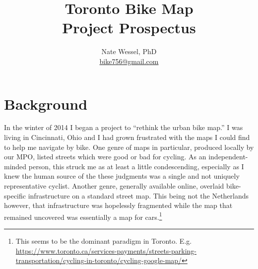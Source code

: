 \documentclass{article}
\title{Toronto Bike Map \\ Project Prospectus}
\author{Nate Wessel, PhD \\ \small \href{mailto:bike756@gmail.com}{bike756@gmail.com}}
\begin{document}
	\maketitle
	
	\section*{Background}
		In the winter of 2014 I began a project to ``rethink the urban bike map.'' 
		I was living in Cincinnati, Ohio and I had grown frustrated with the maps I could find to help me navigate by bike. One genre of maps in particular, produced locally by our MPO, listed streets which were {\color{ForestGreen}good} or {\color{red}bad} for cycling. As an independent-minded person, this struck me as at least a little condescending, especially as I knew the human source of the these judgments was a single and not uniquely representative cyclist.
		Another genre, generally available online, overlaid bike-specific infrastructure on a standard street map. This being not the Netherlands however, that infrastructure was hopelessly fragmented while the map that remained uncovered was essentially a map for cars.\footnote{This seems to be the dominant paradigm in Toronto. E.g. \href{https://www.toronto.ca/services-payments/streets-parking-transportation/cycling-in-toronto/cycling-google-map/}{https://www.toronto.ca/services-payments/streets-parking-transportation/cycling-in-toronto/cycling-google-map/}}
	
\end{document}
